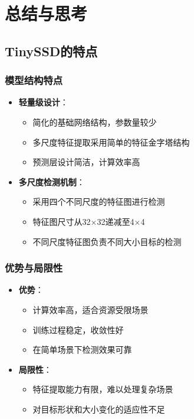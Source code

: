 \documentclass[UTF8]{ctexart}
\begin{document}
\section{总结与思考}

\subsection{TinySSD的特点}

\subsubsection{模型结构特点}
\begin{itemize}
    \item \textbf{轻量级设计}：
    \begin{itemize}
        \item 简化的基础网络结构，参数量较少
        \item 多尺度特征提取采用简单的特征金字塔结构
        \item 预测层设计简洁，计算效率高
    \end{itemize}
    
    \item \textbf{多尺度检测机制}：
    \begin{itemize}
        \item 采用四个不同尺度的特征图进行检测
        \item 特征图尺寸从32$\times$32递减至4$\times$4
        \item 不同尺度特征图负责不同大小目标的检测
    \end{itemize}
\end{itemize}

\subsubsection{优势与局限性}
\begin{itemize}
    \item \textbf{优势}：
    \begin{itemize}
        \item 计算效率高，适合资源受限场景
        \item 训练过程稳定，收敛性好
        \item 在简单场景下检测效果可靠
    \end{itemize}
    
    \item \textbf{局限性}：
    \begin{itemize}
        \item 特征提取能力有限，难以处理复杂场景
        \item 对目标形状和大小变化的适应性不足
    \end{itemize}
\end{itemize}
\end{document}

